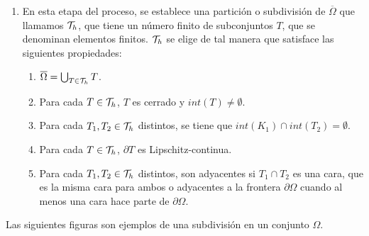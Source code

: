 \begin{enumerate}[{\rm (FEM 1)}]
\item  En esta etapa del proceso, se establece una partici\'on o subdivisi\'on de $\overline{\Omega}$ que llamamos ${\mathcal{T}}_{h}$, que tiene un  n\'umero finito de subconjuntos $T$, que se denominan elementos finitos. ${\mathcal{T}}_{h}$  se elige de tal manera que satisface las siguientes propiedades:
\begin{enumerate}[{\rm  (1)}]
\item  $\overline{\Omega}= \bigcup_{T\in {\ensuremath{\mathcal{T}}}_{h} } T$.
\item Para cada $T\in {\ensuremath{\mathcal{T}}}_{h}$, $T$ es cerrado y $int(T)\neq\emptyset$.
\item Para cada $T_{1},T_{2}\in {\ensuremath{\mathcal{T}}}_{h}$ distintos, se tiene que $int(K_{1})\cap int(T_{2})=\emptyset$.
\item Para cada $T\in {\ensuremath{\mathcal{T}}}_{h}$, $\partial T$ es Lipschitz-continua.
\item Para cada $T_{1},T_{2}\in {\ensuremath{\mathcal{T}}}_{h}$ distintos, son adyacentes si  $T_{1}\cap T_{2}$ es una cara, que es la misma cara para ambos o adyacentes a la frontera $\partial\Omega$ cuando al menos una cara hace parte de $\partial\Omega$.
\end{enumerate}
\end{enumerate} 
Las siguientes figuras son ejemplos de una subdivisi\'on en un conjunto $\Omega$.
